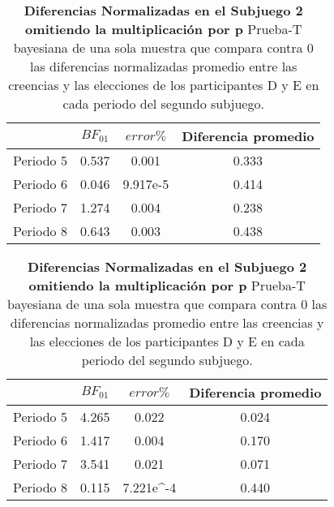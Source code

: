 \begin{table}[h]
\caption[Subjuego 2. Diferencias normalizadas sin la multiplicación por p (participantes A)]{\textbf{Diferencias Normalizadas en el Subjuego 2 omitiendo la multiplicación por p} Prueba-T bayesiana de una sola muestra que compara contra 0 las diferencias normalizadas promedio entre las creencias y las elecciones de los participantes D y E en cada periodo del segundo subjuego.}
\label{DNnop-S2-A-B}
\centering
\begin{tabular}{l | c c | c}
\toprule
\textbf{} & \textbf{$BF_{01}$} & \textbf{$error\%$} & \textbf{Diferencia promedio}\\
\midrule
Periodo 5 & 0.537 & 0.001 & 0.333\\
Periodo 6 & 0.046 & 9.917e-5 & 0.414\\
Periodo 7 & 1.274 & 0.004 & 0.238\\
Periodo 8 & 0.643 & 0.003 & 0.438\\
\bottomrule
\end{tabular}
\end{table}


\begin{table}[h]
\caption[Subjuego 2. Diferencias normalizadasDiferencias normalizadas sin la multiplicación por p (participantes D y E)]{\textbf{Diferencias Normalizadas en el Subjuego 2 omitiendo la multiplicación por p} Prueba-T bayesiana de una sola muestra que compara contra 0 las diferencias normalizadas promedio entre las creencias y las elecciones de los participantes D y E en cada periodo del segundo subjuego.}
\label{DNnop-S2-DyE-B}
\centering
\begin{tabular}{l | c c | c}
\toprule
\textbf{} & \textbf{$BF_{01}$} & \textbf{$error\%$} & \textbf{Diferencia promedio}\\
\midrule
Periodo 5 & 4.265 & 0.022 & 0.024\\
Periodo 6 & 1.417 & 0.004 & 0.170\\
Periodo 7 & 3.541 & 0.021 & 0.071\\
Periodo 8 & 0.115 & 7.221e^-4 & 0.440\\
\bottomrule
\end{tabular}
\end{table}
  

